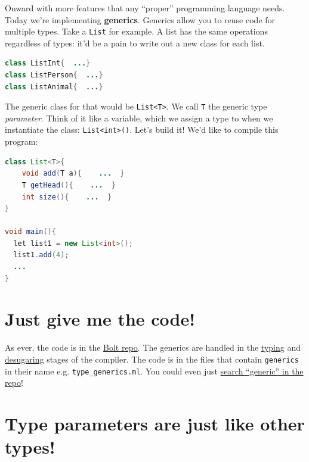 Onward with more features that any ``proper'' programming language
needs. Today we're implementing \textbf{generics}. Generics allow you to
reuse code for multiple types. Take a \texttt{List} for example. A list
has the same operations regardless of types: it'd be a pain to write out
a new class for each list.


\begin{lstlisting}[language=Java]
class ListInt{  ...}
class ListPerson{  ...}
class ListAnimal{  ...}
\end{lstlisting}

The generic class for that would be
\texttt{List\textless{}T\textgreater{}}. We call \texttt{T} the generic
type \emph{parameter}. Think of it like a variable, which we assign a
type to when we instantiate the class:
\texttt{List\textless{}int\textgreater{}()}. Let's build it! We'd like
to compile this program:


\begin{lstlisting}[language=Java]
class List<T>{  
    void add(T a){    ...  }  
    T getHead(){    ...  }  
    int size(){    ...  }
}

void main(){  
  let list1 = new List<int>();  
  list1.add(4);  
  ...
}
\end{lstlisting}

\hypertarget{just-give-me-the-code}{%
\section{\texorpdfstring{\protect\hyperlink{just-give-me-the-code}{}Just
give me the
code!}{Just give me the code!}}\label{just-give-me-the-code}}

As ever, the code is in the
\href{https://github.com/mukul-rathi/bolt}{Bolt repo}. The generics are
handled in the
\href{https://github.com/mukul-rathi/bolt/tree/master/src/frontend/typing}{typing}
and
\href{https://github.com/mukul-rathi/bolt/tree/master/src/frontend/desugaring}{desugaring}
stages of the compiler. The code is in the files that contain
\texttt{generics} in their name e.g. \texttt{type\_generics.ml}. You
could even just
\href{https://github.com/mukul-rathi/bolt/search?q=generic}{search
``generic'' in the repo}!

\hypertarget{type-parameters-are-just-like-other-types}{%
\section{\texorpdfstring{\protect\hyperlink{type-parameters-are-just-like-other-types}{}Type
parameters are just like other
types!}{Type parameters are just like other types!}}\label{type-parameters-are-just-like-other-types}}


